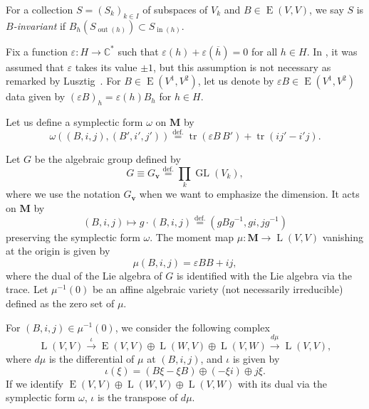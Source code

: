 \documentclass[12pt]{amsart}
\def\Bbb{\mathbb}
\theoremstyle{definition}
\theoremstyle{remark}
\numberwithin{equation}{subsection}
\newcommand{\defeq}{\overset{\operatorname{\scriptstyle def.}}{=}}
\newcommand{\C}{{\Bbb C}}
\newcommand{\GL}{\operatorname{GL}}
\newcommand{\tr}{\operatorname{tr}}
\newcommand{\vin}{\operatorname{in}} %
\newcommand{\vout}{\operatorname{out}} %
\newcommand{\bM}{{\mathbf M}} %
\newcommand{\bv}{{\mathbf v}} %
\newcommand{\HomE}{\operatorname{E}}
\newcommand{\HomL}{\operatorname{L}}
\begin{document}
For a collection $S = (S_k)_{k\in I}$ of subspaces of $V_k$ and
$B\in\HomE(V, V)$, we say $S$ is {\it $B$-invariant\/} if
$B_h(S_{\vout(h)}) \subset S_{\vin(h)}$.

Fix a function $\varepsilon\colon H \to \C^*$ such that
$\varepsilon(h) + \varepsilon(\overline{h}) = 0$ for all $h\in H$.
%
In \cite{Na-quiver,Na-alg}, it was assumed that $\varepsilon$ takes
its value $\pm 1$, but this assumption is not necessary as remarked by 
Lusztig~\cite{Lu-qv}.
%
For $B\in\HomE(V^1, V^2)$, let us denote
by $\varepsilon B\in \HomE(V^1, V^2)$ data given by $(\varepsilon B)_h 
= \varepsilon(h) B_h$ for $h\in H$.

Let us define a symplectic form $\omega$ on $\bM$ by
\begin{equation}
        \omega((B, i, j), (B', i', j'))
        \defeq \tr(\varepsilon B\, B') + \tr(i j' - i' j).
\label{def:symplectic}\end{equation}

Let $G$ be the algebraic group defined by
\begin{equation*}
  G \equiv G_{\bv} \defeq \prod_k \GL(V_k),
\end{equation*}
where we use the notation $G_\bv$ when we want to emphasize the
dimension.
It acts on $\bM$ by
\begin{equation}\label{eq:Gaction}
  (B, i, j) \mapsto g\cdot (B, i, j) \defeq (g B g^{-1}, g i, j g^{-1})
\end{equation}
preserving the symplectic form $\omega$. The moment map
$\mu\colon\bM\to\HomL(V, V)$ vanishing at the origin is given by
\begin{equation}\label{eq:mu}
  \mu(B, i, j) = \varepsilon B B + i j,
\end{equation}
where the dual of the Lie algebra of $G$ is identified with the Lie
algebra via the trace.
%
Let $\mu^{-1}(0)$ be an affine algebraic variety (not necessarily
irreducible) defined as the zero set of $\mu$.

For $(B,i,j)\in\mu^{-1}(0)$, we consider the following complex
\begin{equation}\label{eq:quiver_tangent}
        \HomL(V, V)
        \overset{\iota}{\longrightarrow}
        \HomE(V, V) \oplus \HomL(W, V) \oplus \HomL(V,W)
        \overset{d \mu}{\longrightarrow}
        \HomL(V, V),
\end{equation}
where $d\mu$ is the differential of $\mu$ at $(B,i,j)$, and $\iota$ is
given by
\begin{equation*}
        \iota(\xi) = (B \xi - \xi B) \oplus
         (-\xi i) \oplus j \xi.
\end{equation*}
If we identify $\HomE(V, V) \oplus \HomL(W, V) \oplus \HomL(V,W)$ with
its dual via the symplectic form $\omega$,
$\iota$ is the transpose of $d \mu$.
\end{document}

